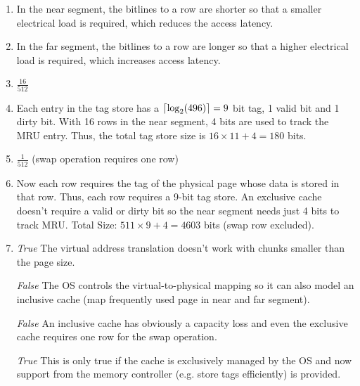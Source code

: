 \documentclass[a4paper]{article}
\DeclarePairedDelimiter\ceil{\lceil}{\rceil}
\begin{document}
\begin{enumerate}[label=\alph*)]
    \item In the near segment, the bitlines to a row are shorter so that a smaller electrical load
        is required, which reduces the access latency.

    \item In the far segment, the bitlines to a row are longer so that a higher electrical load is
        required, which increases access latency.

    \item $\frac{16}{512}$

    \item Each entry in the tag store has a $\ceil*{\log_2(496)} = 9$ bit tag, 1 valid bit and 1 
        dirty bit. With 16 rows in the near segment, 4 bits are used to track the MRU entry. Thus,
        the total tag store size is $16\times11 + 4=180$ bits.

    \item $\frac{1}{512}$ (swap operation requires one row)

    \item Now each row requires the tag of the physical page whose data is stored in that row. Thus,
        each row requires a 9-bit tag store. An exclusive cache doesn't require a valid or dirty bit
        so the near segment needs just 4 bits to track MRU. Total Size: $511 \times 9 + 4 = 4603$ bits
        (swap row excluded).

    \item \textit{True} The virtual address translation doesn't work with chunks smaller than the page
        size.

          \textit{False} The OS controls the virtual-to-physical mapping so it can also model an
          inclusive cache (map frequently used page in near and far segment).

          \textit{False} An inclusive cache has obviously a capacity loss and even the exclusive
          cache requires one row for the swap operation.

          \textit{True} This is only true if the cache is exclusively managed by the OS and now
          support from the memory controller (e.g. store tags efficiently) is provided.
\end{enumerate}
\end{document}
